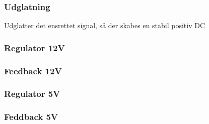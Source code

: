 \subsubsection{Udglatning}
Udglatter det ensrettet signal, så der skabes en stabil positiv DC 
\subsubsection{Regulator 12V}
\subsubsection{Feedback 12V}
\subsubsection{Regulator 5V}
\subsubsection{Feddback 5V}